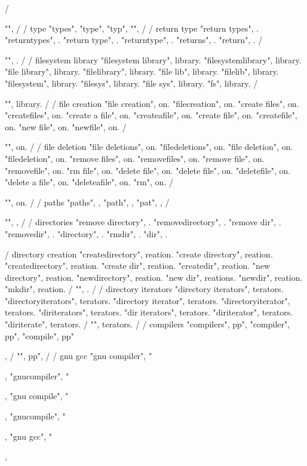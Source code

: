         / {"", 
        /
        / type 
        "types",  
        "type",  
        "typ",  
        "", 
        /
        / return type 
        "return types", . 
        "returntypes", . 
        "return type", . 
        "returntype", . 
        "returns", . 
        "return", . 
        / {"", .
        /
        / filesystem library
        "filesystem library", library. 
        "filesystemlibrary", library. 
        "file library", library. 
        "filelibrary", library. 
        "file lib", library. 
        "filelib", library. 
        "filesystem", library. 
        "filesys", library. 
        "file sys", library. 
        "fs", library. 
        / {"", library.
        / 
        / file creation 
        "file creation", on. 
        "filecreation", on. 
        "create files", on. 
        "createfiles", on. 
        "create a file", on. 
        "createafile", on. 
        "create file", on. 
        "createfile", on. 
        "new file", on. 
        "newfile", on. 
        / {"", on.
        /
        / file deletion 
        "file deletions", on. 
        "filedeletions", on. 
        "file deletion", on. 
        "filedeletion", on. 
        "remove files", on. 
        "removefiles", on. 
        "remove file", on. 
        "removefile", on. 
        "rm file", on. 
        "delete file", on. 
        "delete file", on. 
        "deletefile", on. 
        "delete a file", on. 
        "deleteafile", on. 
        "rm", on. 
        / {"", on. 
        /
        / paths 
        "paths", , 
        "path", , 
        "pat", , 
        / {"", ,
        /
        / directories
        "remove directory", . 
        "removedirectory", . 
        "remove dir", . 
        "removedir", . 
        "directory", . 
        "rmdir", . 
        "dir", . 

        / directory creation
        "createdirectory", reation. 
        "create directory", reation. 
        "createdirectory", reation. 
        "create dir", reation. 
        "createdir", reation. 
        "new directory", reation. 
        "newdirectory", reation. 
        "new dir", reations. 
        "newdir", reation. 
        "mkdir", reation. 
        / {"", .
        /
        / directory iterators 
        "directory iterators", terators. 
        "directoryiterators", terators. 
        "directory iterator", terators. 
        "directoryiterator", terators. 
        "diriterators", terators. 
        "dir iterators", terators. 
        "diriterator", terators. 
        "diriterate", terators. 
        / {"", terators.
        /
        / compilers 
        "compilers", pp"}, 
        "compiler", pp"}, 
        "compile", pp"}, 
        / {"", pp"},
        /
        / gnu gcc
        "gnu compiler", "},
        "gnucompiler", "},
        "gnu compile", "},
        "gnucompile", "},
        "gnu gcc", "},

